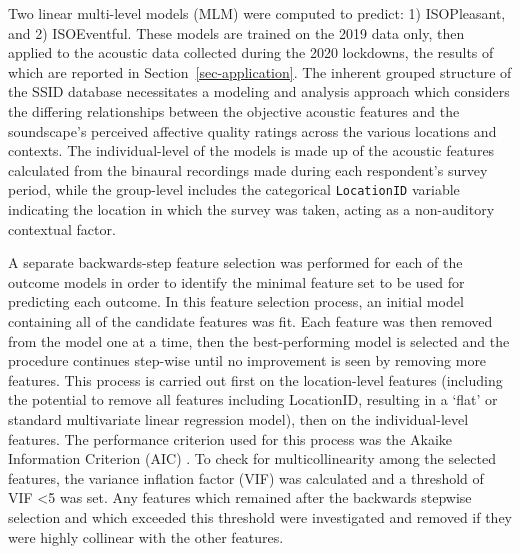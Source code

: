 \documentclass[
  authoryear,
  preprint,
  3p,
  onecolumn]{elsarticle}
\begin{document}
Two linear multi-level models (MLM) were computed to predict: 1)
ISOPleasant, and 2) ISOEventful. These models are trained on the 2019
data only, then applied to the acoustic data collected during the 2020
lockdowns, the results of which are reported in
Section~\ref{sec-application}. The inherent grouped structure of the
SSID database necessitates a modeling and analysis approach which
considers the differing relationships between the objective acoustic
features and the soundscape's perceived affective quality ratings across
the various locations and contexts. The individual-level of the models
is made up of the acoustic features calculated from the binaural
recordings made during each respondent's survey period, while the
group-level includes the categorical \texttt{LocationID} variable
indicating the location in which the survey was taken, acting as a
non-auditory contextual factor.

A separate backwards-step feature selection was performed for each of
the outcome models in order to identify the minimal feature set to be
used for predicting each outcome. In this feature selection process, an
initial model containing all of the candidate features was fit. Each
feature was then removed from the model one at a time, then the
best-performing model is selected and the procedure continues step-wise
until no improvement is seen by removing more features. This process is
carried out first on the location-level features (including the
potential to remove all features including LocationID, resulting in a
`flat' or standard multivariate linear regression model), then on the
individual-level features. The performance criterion used for this
process was the Akaike Information Criterion (AIC)
\citep{Akaike1974new}. To check for multicollinearity among the selected
features, the variance inflation factor (VIF) was calculated and a
threshold of VIF \textless5 was set. Any features which remained after
the backwards stepwise selection and which exceeded this threshold were
investigated and removed if they were highly collinear with the other
features.
\end{document}

